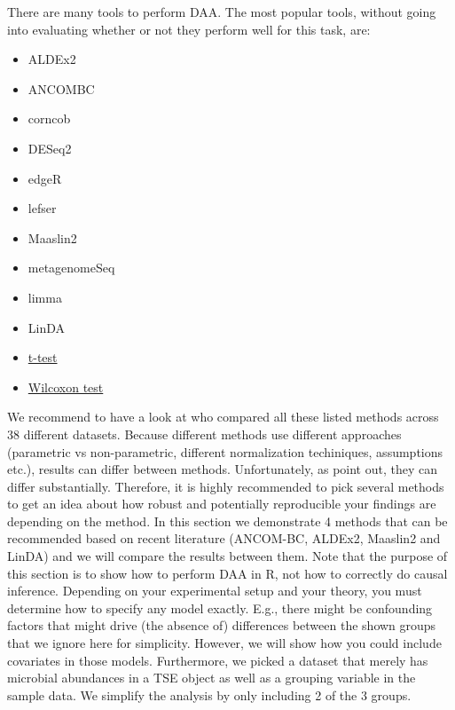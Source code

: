 \documentclass[
]{book}
\providecommand{\tightlist}{%
  \setlength{\itemsep}{0pt}\setlength{\parskip}{0pt}}
\begin{document}
There are many tools to perform DAA. The most popular tools, without going into
evaluating whether or not they perform well for this task, are:

\begin{itemize}
\tightlist
\item
  ALDEx2 \citep{Gloor2016}
\item
  ANCOMBC \citep{ancombc2020}
\item
  corncob \citep{Martin2021}
\item
  DESeq2 \citep{Love2014}
\item
  edgeR \citep{Chen2016}
\item
  lefser \citep{Khlebrodova2021}
\item
  Maaslin2 \citep{Mallick2020}
\item
  metagenomeSeq \citep{Paulson2017}
\item
  limma \citep{Ritchie2015}
\item
  LinDA \citep{Zhou2022}
\item
  \href{https://www.rdocumentation.org/packages/stats/versions/3.6.2/topics/t.test}{t-test}\\
\item
  \href{https://www.rdocumentation.org/packages/stats/versions/3.6.2/topics/wilcox.test}{Wilcoxon test}
\end{itemize}

We recommend to have a look at \citet{Nearing2022}
who compared all these listed methods across 38
different datasets. Because different methods use different approaches
(parametric vs non-parametric, different normalization techiniques, assumptions
etc.), results can differ between methods.
Unfortunately, as \citet{Nearing2022} point out, they
can differ substantially. Therefore, it is highly recommended to pick several
methods to get an idea about how robust and potentially reproducible your
findings are depending on the method. In this section we demonstrate 4 methods
that can be recommended based on recent literature (ANCOM-BC, ALDEx2, Maaslin2
and LinDA) and we will compare the results between them.
Note that the purpose of this section is to show how to perform DAA in R, not
how to correctly do causal inference. Depending on your experimental setup
and your theory, you must determine how to specify any model exactly.
E.g., there might be confounding factors that might drive (the absence of)
differences between the shown groups that we ignore here for simplicity.
However, we will show how you could include covariates in those models.
Furthermore, we picked a dataset that merely has microbial abundances in a TSE
object as well as a grouping variable in the sample data. We simplify the
analysis by only including 2 of the 3 groups.
\end{document}

